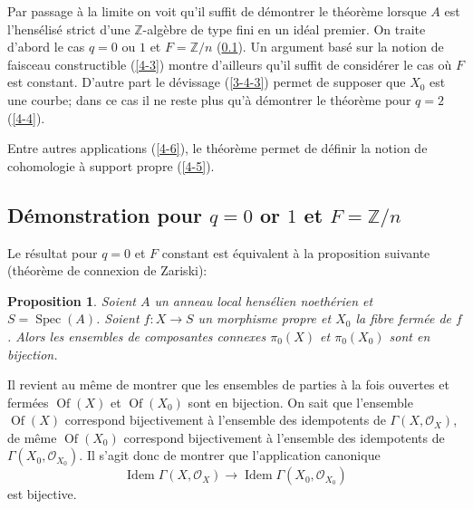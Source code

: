 \documentclass{article}
\DeclareMathOperator{\spec}{Spec}
\newcommand{\cO}{\mathcal{O}}
\newcommand{\dZ}{\mathbb{Z}}
\newtheorem{proposition}[subsubsection]{Proposition}
\begin{document}
Par passage \`a la limite on voit qu'il suffit de d\'emontrer le théorème 
lorsque $A$ est l'hens\'elis\'e strict d'une $\dZ$-alg\`ebre  de type fini en 
un id\'eal premier. On traite d'abord le cas $q=0$ ou $1$ et $F=\dZ/n$ 
(\ref{4-2}). Un argument bas\'e sur la notion de faisceau constructible 
(\ref{4-3}) montre d'ailleurs qu'il suffit de consid\'erer le cas o\`u $F$ est 
constant. D'autre part le d\'evissage (\ref{3-4-3}) permet de supposer que 
$X_0$ est une courbe; dans ce cas il ne reste plus qu'\`a d\'emontrer le 
théorème pour $q=2$ (\ref{4-4}). 

Entre autres applications (\ref{4-6}), le théorème permet de définir la notion 
de cohomologie \`a support propre (\ref{4-5}). 










\subsection{Démonstration pour \texorpdfstring{$q=0$}{q=1} or \texorpdfstring{$1$}{1} et \texorpdfstring{$F=\dZ/n$}{F=Z/n}}\label{4-2} 

Le r\'esultat pour $q=0$ et $F$ constant est \'equivalent \`a la proposition 
suivante (théorème de connexion de Zariski):





\begin{proposition}\label{4-2-1}
Soient $A$ un anneau local hens\'elien noeth\'erien et $S=\spec(A)$. 
Soient $f:X\to S$ un morphisme propre et $X_0$ la fibre ferm\'ee de $f$. Alors 
les ensembles de composantes connexes $\pi_0(X)$ et $\pi_0(X_0)$ sont en 
bijection.
\end{proposition}

Il revient au m\^eme de montrer que les ensembles de parties \`a la fois 
ouvertes et ferm\'ees $\operatorname{Of}(X)$ et $\operatorname{Of}(X_0)$ sont 
en bijection. On sait que l'ensemble $\operatorname{Of}(X)$ correspond 
bijectivement \`a l'ensemble des idempotents de $\Gamma(X,\cO_X)$, de m\^eme 
$\operatorname{Of}(X_0)$ correspond bijectivement \`a l'ensemble des 
idempotents de $\Gamma(X_0,\cO_{X_0})$. Il s'agit donc de montrer que 
l'application canonique 
\[
  \operatorname{Idem} \Gamma(X,\cO_X) \to \operatorname{Idem}\Gamma(X_0,\cO_{X_0})
\]
est bijective. 
\end{document}
